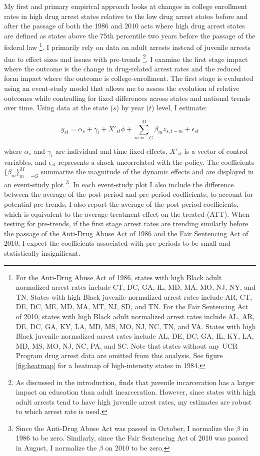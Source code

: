 \documentclass{article}
\begin{document}
My first and primary empirical approach looks at changes in college enrollment rates in high drug arrest states relative to the low drug arrest states before and after the passage of both the 1986 and 2010 acts where high drug arrest states are defined as states above the 75th percentile two years before the passage of the federal law \footnote{For the Anti-Drug Abuse Act of 1986, states with high Black adult normalized arrest rates include CT, DC, GA, IL, MD, MA, MO, NJ, NY, and TN. States with high Black juvenile normalized arrest rates include AR, CT, DE, DC, ME, MD, MA, MT, NJ, SD, and TN. For the Fair Sentencing Act of 2010, states with high Black adult normalized arrest rates include AL, AR, DE, DC, GA, KY, LA, MD, MS, MO, NJ, NC, TN, and VA. States with high Black juvenile normalized arrest rates include AL, DE, DC, GA, IL, KY, LA, MD, MS, MO, NJ, NC, PA, and SC. Note that states without any UCR Program drug arrest data are omitted from this analysis. See figure \ref{fig:heatmap} for a heatmap of high-intensity states in 1984.}. I primarily rely on data on adult arrests instead of juvenile arrests due to effect sizes and issues with pre-trends \footnote{As discussed in the introduction, \cite{aizer} finds that juvenile incarceration has a larger impact on education than adult incarceration. However, since states with high adult arrests tend to have high juvenile arrest rates, my estimates are robust to which arrest rate is used.}. I examine the first stage impact where the outcome is the change in drug-related arrest rates and the reduced form impact where the outcome is college-enrollment. The first stage is evaluated using an event-study model that allows me to assess the evolution of relative outcomes while controlling for fixed differences across states and national trends over time. Using data at the state ($s$) by year ($t$) level, I estimate:

\begin{equation} \label{eq:state_level_es}
  y_{st} = \alpha_s + \gamma_t + X'_{st} \phi + \sum_{m=-G}^{M} \beta_m z_{s,t-m} + \epsilon_{st}
\end{equation}

where $\alpha_s$ and $\gamma_t$ are individual and time fixed effects, $X'_{st}$ is a vector of control variables, and $\epsilon_{st}$ represents a shock uncorrelated with the policy. The coefficients $\{\beta_m \}^{M}_{m=-G}$ summarize the magnitude of the dynamic effects and are displayed in an event-study plot \footnote{Since the Anti-Drug Abuse Act was passed in October, I normalize the $\beta$ in 1986 to be zero. Similarly, since the Fair Sentencing Act of 2010 was passed in August, I normalize the $\beta$ on 2010 to be zero.}. In each event-study plot I also include the difference between the average of the post-period and pre-period coefficients; to account for potential pre-trends, I also report the average of the post-period coefficients, which is equivalent to the average treatment effect on the treated (ATT). When testing for pre-trends, if the first stage arrest rates are trending similarly before the passage of the Anti-Drug Abuse Act of 1986 and the Fair Sentencing Act of 2010, I expect the coefficients associated with pre-periods to be small and statistically insignificant.
\end{document}
